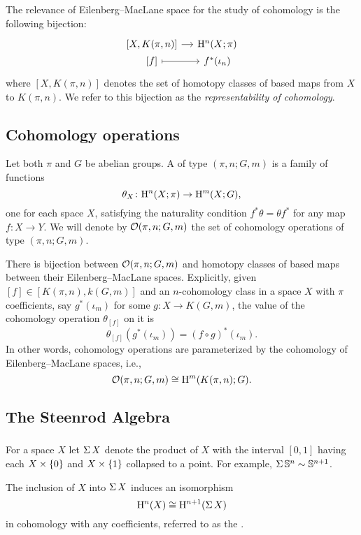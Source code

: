 The relevance of Eilenberg--MacLane space for the study of cohomology is the following bijection:
\[
\begin{tikzcd}[column sep=small, row sep=0]
	{[X, K(\pi, n)]} \rar & \rH^n(X; \pi) \\
	{[f]} \rar[maps to] & f^*(\iota_n)
\end{tikzcd}
\]
where $[X, K(\pi, n)]$ denotes the set of homotopy classes of based maps from $X$ to $K(\pi, n)$.
We refer to this bijection as the \textit{representability of cohomology}.

\subsection{Cohomology operations}

Let both $\pi$ and $G$ be abelian groups.
A  of type $(\pi, n; G, m)$ is a family of functions
\[
\theta_X \colon \mathrm{H}^n(X; \pi) \to \mathrm{H}^m(X; G),
\]
one for each space $X$, satisfying the naturality condition $f^* \theta = \theta f^*$ for any map $f \colon X \to Y$.
We will denote by $\mathcal{O}(\pi, n; G,m)$ the set of cohomology operations of type $(\pi, n; G,m)$.

There is bijection between $\mathcal{O}(\pi, n; G,m)$ and homotopy classes of based maps between their Eilenberg--MacLane spaces.
Explicitly, given $[f] \in [K(\pi,n), k(G,m)]$ and an $n$-cohomology class in a space $X$ with $\pi$ coefficients, say $g^*(\iota_m)$ for some $g \colon X \to K(G, m)$, the value of the cohomology operation $\theta_{[f]}$ on it is
\[
\theta_{[f]}(g^*(\iota_m)) = (f \circ g)^*(\iota_m).
\]
In other words, cohomology operations are parameterized by the cohomology of Eilenberg--MacLane spaces, i.e.,
\[
\mathcal{O}(\pi, n; G,m) \cong \mathrm{H}^m(K(\pi,n); G).
\]

\subsection{The Steenrod Algebra}\label{ss:steenrod}

\subsubsection{} For a space $X$ let $\operatorname{\Sigma} X$ denote the product of $X$ with the interval $[0,1]$ having each $X \times \{0\}$ and $X \times \{1\}$ collapsed to a point.
For example, $\operatorname{\Sigma} \mathbb{S}^n \sim \mathbb{S}^{n+1}$.

The inclusion of $X$ into $\operatorname{\Sigma} X$ induces an isomorphism
\[
\mathrm{H}^n(X) \cong \mathrm{H}^{n+1}(\operatorname{\Sigma} X)
\]
in cohomology with any coefficients, referred to as the .

